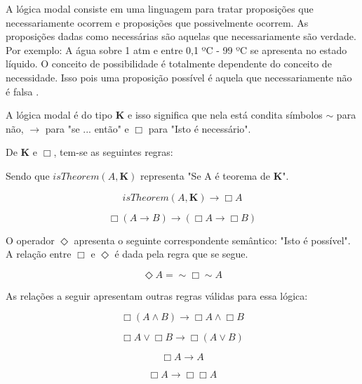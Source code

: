 A lógica modal consiste em uma linguagem para tratar proposições que necessariamente ocorrem e proposições que possivelmente ocorrem. As proposições dadas como necessárias são aquelas que necessariamente são verdade. Por exemplo: A água sobre 1 atm e entre 0,1 ºC - 99 ºC se apresenta no estado líquido. O conceito de possibilidade é totalmente dependente do conceito de necessidade. Isso pois uma proposição possível é aquela que necessariamente não é falsa \cite{modallogic}. 

A lógica modal é do tipo \textbf{K} e isso significa que nela está condita símbolos $ \sim $ para não, $ \rightarrow$ para "se ... então" e $\Box$ para "Isto é necessário". 

De \textbf{K} e $\Box$, tem-se as seguintes regras:

Sendo que $isTheorem(A,\textbf{K})$ representa "Se A é teorema de \textbf{K}". 

\begin{equation} 
isTheorem(A,\textbf{K}) \rightarrow \Box A
\end{equation}
\label{ktheorema}

\begin{equation} 
 \Box (A \rightarrow B) \rightarrow (\Box A \rightarrow \Box B) 
\end{equation}
\label{boxdist}

O operador $\Diamond$ apresenta o seguinte correspondente semântico: "Isto é possível". A relação entre $\Box$ e $\Diamond$ é dada pela regra que se segue.

\begin{equation} 
 \Diamond A = \sim\Box\sim A
\end{equation}
\label{dianotboxnota}

As relações a seguir apresentam outras regras válidas para essa lógica:

\begin{equation} 
 \Box (A \wedge B)  \rightarrow \Box A \wedge \Box B
\end{equation}
\label{boxand}

\begin{equation} 
 \Box A \vee \Box B \rightarrow \Box (A \vee B)
\end{equation}
\label{boxaor}

\begin{equation} 
 \Box A \rightarrow A
\end{equation}
\label{boxtoa}

\begin{equation} 
    \Box A \rightarrow \Box\Box A
\end{equation}
\label{aboxbox}

